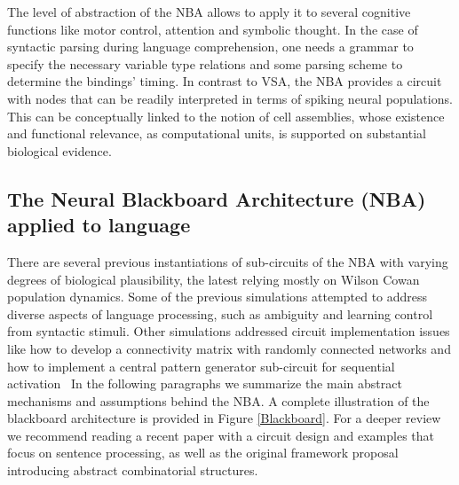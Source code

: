 \documentclass[10pt]{article}
\begin{document}
The level of abstraction of the NBA allows to apply it to several cognitive functions like motor control, attention and symbolic thought.
In the case of syntactic parsing during language comprehension, one needs a grammar to specify the necessary variable type relations and some parsing scheme to determine the bindings' timing.
In contrast to VSA, the NBA provides a circuit with nodes that can be readily interpreted in terms of spiking neural populations.
This can be conceptually linked to the notion of cell assemblies, whose existence and functional relevance, as computational units, is supported on substantial biological evidence\cite{Huyck_2013}.


\subsection{The Neural Blackboard Architecture (NBA) applied to language}

{\label{935508}}

There are several previous instantiations of sub-circuits of the NBA with varying degrees of biological plausibility, 
the latest relying mostly on Wilson Cowan population dynamics\cite{Destexhe_2009}.
Some of the previous simulations attempted to address diverse aspects of language processing, 
such as ambiguity\cite{Frank_2014} and learning control from syntactic stimuli\cite{van_der_Velde_2010}.
Other simulations addressed circuit implementation issues like how to develop a connectivity matrix with randomly 
connected networks\cite{van_der_Velde_2011} and how to implement a central pattern generator sub-circuit for sequential activation~\cite{van_Dijk_2015}
In the following paragraphs we summarize the main abstract mechanisms and assumptions behind the NBA. A 
complete illustration of the blackboard architecture is provided in Figure {\ref{Blackboard}}.
For a deeper review we recommend reading a recent paper with a circuit design and examples that focus on sentence processing\cite{de2016combinatorial}, as well as the 
original framework proposal introducing abstract combinatorial structures\cite{van_der_Velde_2006}.
\end{document}
